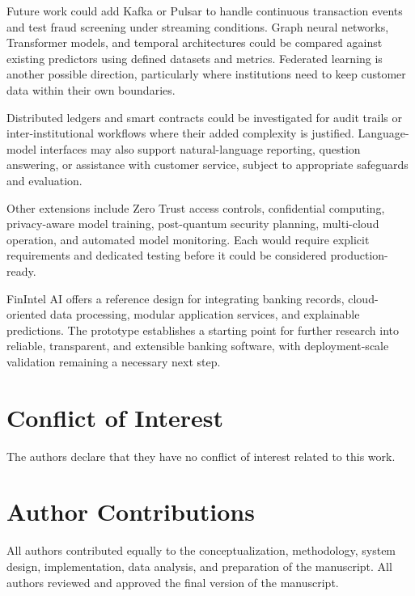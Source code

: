 \documentclass[conference]{IEEEtran}
\begin{document}
Future work could add Kafka or Pulsar to handle continuous transaction events and test fraud screening under streaming conditions. Graph neural networks, Transformer models, and temporal architectures could be compared against existing predictors using defined datasets and metrics. Federated learning is another possible direction, particularly where institutions need to keep customer data within their own boundaries.

Distributed ledgers and smart contracts could be investigated for audit trails or inter-institutional workflows where their added complexity is justified. Language-model interfaces may also support natural-language reporting, question answering, or assistance with customer service, subject to appropriate safeguards and evaluation.

Other extensions include Zero Trust access controls, confidential computing, privacy-aware model training, post-quantum security planning, multi-cloud operation, and automated model monitoring. Each would require explicit requirements and dedicated testing before it could be considered production-ready.

FinIntel AI offers a reference design for integrating banking records, cloud-oriented data processing, modular application services, and explainable predictions. The prototype establishes a starting point for further research into reliable, transparent, and extensible banking software, with deployment-scale validation remaining a necessary next step.

\section*{Conflict of Interest}

The authors declare that they have no conflict of interest related to this work.

\section*{Author Contributions}

All authors contributed equally to the conceptualization, methodology, system design, implementation, data analysis, and preparation of the manuscript. All authors reviewed and approved the final version of the manuscript.



\end{document}
